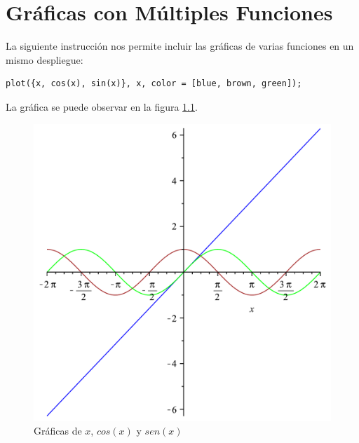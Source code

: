 
\chapter{Gráficas con Múltiples Funciones}

La siguiente instrucción nos permite incluir las gráficas de varias funciones en un mismo despliegue:

\begin{verbatim}
plot({x, cos(x), sin(x)}, x, color = [blue, brown, green]);
\end{verbatim}

La gráfica se puede observar en la figura \ref{cap3f1}.

\begin{figure}[h!]
\centering
\includegraphics[scale=0.35]{grafica05}
\caption{Gráficas de $x$, $cos(x)$ y $sen(x)$}\label{cap3f1}
\end{figure}


